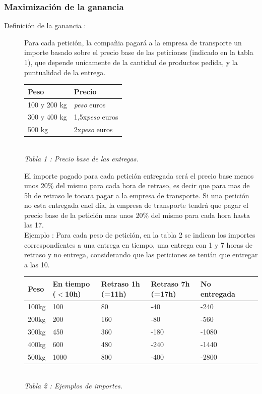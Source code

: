 \documentclass{article}
\begin{document}
\subsubsection{Maximización de la ganancia}
\begin{description}
\item[Definición de la ganancia :]
Para cada petición, la compañia pagará a la empresa de transporte un importe
basado sobre el precio base de las peticiones (indicado en la tabla 1), que
depende unicamente de la cantidad de productos pedida, y la puntualidad de la 
entrega.\\
\begin{center}
\begin{tabular}{|l|l|}
\hline
Peso & Precio\\
\hline
100 y 200 kg & {\it peso} euros\\
300 y 400 kg & 1,5x{\it peso} euros\\
500 kg & 2x{\it peso} euros\\
\hline
\end{tabular}\\
{\it Tabla 1 : Precio base de las entregas.} \end{center}
El importe pagado para cada petición entregada será el precio base menos unos
20\% del mismo para cada hora de retraso, es decir que para mas de 5h de retraso
le tocara pagar a la empresa de transporte. Si una petición no esta entregada enel día, la empresa de transporte tendrá que pagar el precio base de la petición
mas unos 20\% del mismo para cada hora hasta las 17.\\

Ejemplo : Para cada peso de petición, en la tabla 2 se indican los
importes correspondientes a una entrega en tiempo, una entrega con 1 y 7 horas
de retraso y no entrega, considerando que las peticiones se tenián que entregar
a las 10.
\begin{center}
\begin{tabular}{|l|l|l|l|l|l|l|}
\hline
Peso & En tiempo ($<$10h) & Retraso 1h (=11h) & Retraso 7h (=17h) &
No entregada\\
\hline
100kg & 100 & 80 & -40 & -240\\
200kg & 200 & 160 & -80 & -560\\
300kg & 450 & 360 & -180 & -1080\\
400kg & 600 & 480 & -240 & -1440\\
500kg & 1000 & 800 & -400 & -2800\\
\hline
\end{tabular}\\
{\it Tabla 2 : Ejemplos de importes.} \end{center}
\end{description}
\end{document}
